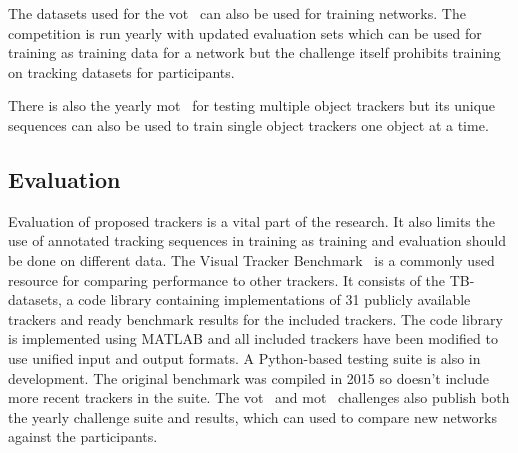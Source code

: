 The datasets used for the \ac{vot}~\cite{VOT} can also be used for training networks. The competition
is run yearly with updated evaluation sets which can be used for training as training
data for a network but the challenge itself prohibits training on tracking datasets for
participants.

There is also the yearly \ac{mot}~\cite{MOT16} for testing multiple object trackers but
its unique sequences can also be used to train single object trackers one object at a
time.

\subsection{Evaluation}
Evaluation of proposed trackers is a vital part of the research. It also limits the use
of annotated tracking sequences in training as training and evaluation should be done
on different data.
The Visual Tracker Benchmark~\cite{VTB} is a commonly used resource for comparing
performance to other trackers. It consists of the TB-datasets, a code library containing
implementations of 31 publicly available trackers and ready benchmark results for the
included trackers. The code library is implemented using MATLAB and all included trackers
have been modified to use unified input and output formats. A Python-based testing suite
is also in development. The original benchmark was compiled in 2015 so doesn't include
more recent trackers in the suite. The \ac{vot}~\cite{VOT} and \ac{mot}~\cite{MOT16}
challenges also publish both the yearly challenge suite and results, which can used to
compare new networks against the participants.
